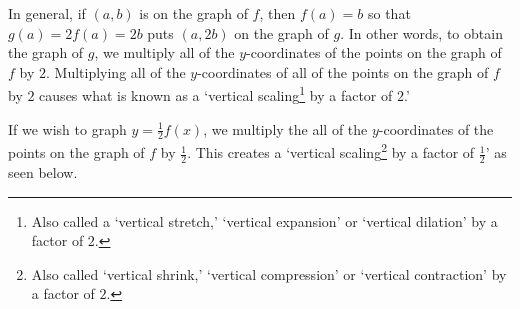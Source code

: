 \documentclass{ximera}
\begin{document}
In general, if $(a,b)$ is on the graph of $f$, then $f(a) = b$ so that $g(a) = 2 f(a) = 2b$ puts $(a,2b)$ on the graph of $g$.  In other words, to obtain the graph of $g$, we multiply all of the $y$-coordinates of the points on the graph of $f$ by $2$.  Multiplying all of the $y$-coordinates of all of the points on the graph of $f$ by $2$ causes what is known as a `vertical scaling\footnote{Also called a `vertical stretch,' `vertical expansion' or `vertical dilation' by a factor of $2$.} by a factor of $2$.'



If we wish to graph $y = \frac{1}{2} f(x)$, we multiply the all of the $y$-coordinates of the points on the graph of $f$ by $\frac{1}{2}$.  This creates a `vertical scaling\footnote{Also called `vertical shrink,' `vertical compression' or `vertical contraction' by a factor of $2$.} by a factor of $\frac{1}{2}$' as seen below.
\end{document}

